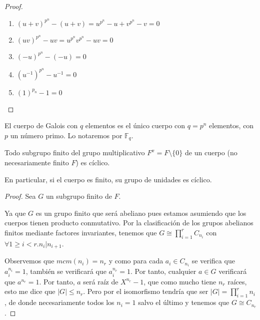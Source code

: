 \begin{proof}
\begin{enumerate}
\item $(u+v)^{p^n} - (u+v) = u^{p^n}-u+v^{p^n}-v = 0$
\item $(uv)^{p^n}-uv = u^{p^n}v^{p^n} - uv = 0$
\item $(-u)^{p^n} - (-u) = 0$
\item $(u^{-1})^{p^n} - u^{-1} = 0$
\item $(1)^{p_n} - 1 = 0$
\end{enumerate}
\end{proof}

\begin{definition}
El cuerpo de Galois con $q$ elementos es el único cuerpo con $q = p^n$ elementos, con $p$ un número primo. Lo notaremos por $\mathbb{F}_q$. 
\end{definition}

\begin{proposition}
	Todo subgrupo finito del grupo multiplicativo $F^x = F \setminus \{0\}$ de un cuerpo (no necesariamente finito $F$) es cíclico.
	
	En particular, si el cuerpo es finito, su grupo de unidades es cíclico. 
\end{proposition}
\begin{proof}
	Sea $G$ un subgrupo finito de $F$. 
	
	Ya que $G$ es un grupo finito que será abeliano pues estamos asumiendo que los cuerpos tienen producto conmutativo. Por la clasificación de los grupos abelianos finitos mediante factores invariantes, tenemos que $G \cong \prod_{i = 1}^r C_{n_i}$ con $\forall 1 \ge i < r. n_i|n_{i+1}$.
	
	Observemos que $mcm(n_i) = n_r$ y como para cada $a_i \in C_{n_i}$ se verifica que $a_i^{n_i} = 1$, también se verificará que $a_i^{n_r} = 1$. Por tanto, cualquier $a \in G$ verificará que $a^{n_r} = 1$. Por tanto, $a$ será raíz de $X^{n_r}-1$, que como mucho tiene $n_r$ raíces, esto me dice que $|G| \le n_r$. Pero por el isomorfismo tendría que ser $|G| = \prod_{i = 1}^r n_i$, de donde necesariamente todos los $n_i = 1$ salvo el último y tenemos que $G \cong C_{n_r}$. 
\end{proof}

